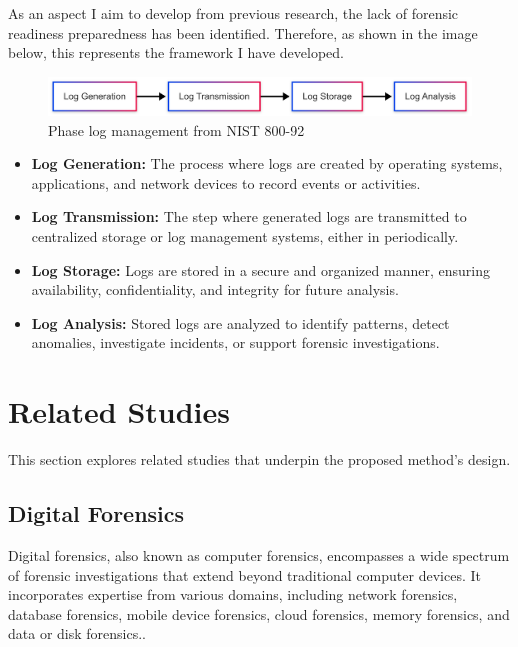 As an aspect I aim to develop from previous research, the lack of forensic readiness preparedness has been identified. Therefore, as shown in the image below, this represents the framework I have developed.

\begin{figure}[H] 
    \centering
    \includegraphics[width=14cm]{figure/log-management-nist-800-92-original.png}
    \caption{ Phase log management from NIST 800-92}
    \label{fig:nist-log-management-phase}
\end{figure}


\begin{itemize}
    \item \textbf{Log Generation:} The process where logs are created by operating systems, applications, and network devices to record events or activities.
    \item \textbf{Log Transmission:} The step where generated logs are transmitted to centralized storage or log management systems, either in periodically.
    \item \textbf{Log Storage:} Logs are stored in a secure and organized manner, ensuring availability, confidentiality, and integrity for future analysis.
    \item \textbf{Log Analysis:} Stored logs are analyzed to identify patterns, detect anomalies, investigate incidents, or support forensic investigations.
\end{itemize}


\section{Related Studies}
This section explores related studies that underpin the proposed method's design.

\subsection{Digital Forensics}  Digital forensics, also known as computer forensics, encompasses a wide spectrum of forensic investigations that extend beyond traditional computer devices. It incorporates expertise from various domains, including network forensics, database forensics, mobile device forensics, cloud forensics, memory forensics, and data or disk forensics.\cite{paul2019analysisdf}.

